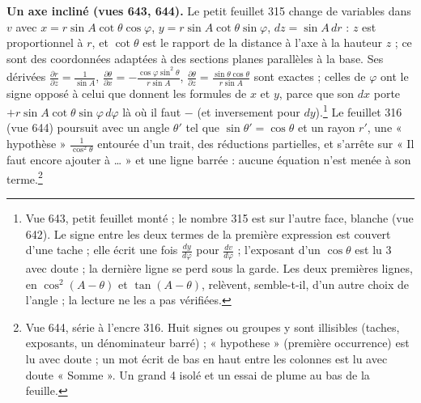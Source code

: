 \documentclass[11pt,a4paper]{article}
\begin{document}
\textbf{Un axe incliné (vues 643, 644).} Le petit feuillet 315 change de
variables dans $v$ avec $x = r\sin A\cot\theta\cos\varphi$, $y = r\sin
A\cot\theta\sin\varphi$, $dz = \sin A\,dr$ : $z$ est proportionnel à $r$, et
$\cot\theta$ est le rapport de la distance à l'axe à la hauteur $z$ ; ce sont
des coordonnées adaptées à des sections planes parallèles à la base. Ses
dérivées $\frac{\partial r}{\partial z} = \frac{1}{\sin A}$,
$\frac{\partial\theta}{\partial x} = -\frac{\cos\varphi\sin^2\theta}{r\sin A}$,
$\frac{\partial\theta}{\partial z} = \frac{\sin\theta\cos\theta}{r\sin A}$ sont
exactes ; celles de $\varphi$ ont le signe opposé à celui que donnent les
formules de $x$ et $y$, parce que son $dx$ porte $+r\sin A\cot\theta\sin\varphi
\,d\varphi$ là où il faut $-$ (et inversement pour $dy$).\footnote{Vue 643, petit
feuillet monté ; le nombre 315 est sur l'autre face, blanche (vue 642). Le
signe entre les deux termes de la première expression est couvert d'une tache
; elle écrit une fois $\frac{dy}{d\varphi}$ pour $\frac{dv}{d\varphi}$ ;
l'exposant d'un $\cos\theta$ est lu 3 avec doute ; la dernière ligne se perd
sous la garde. Les deux premières lignes, en $\cos^2(A-\theta)$ et
$\tan(A-\theta)$, relèvent, semble-t-il, d'un autre choix de l'angle ; la
lecture ne les a pas vérifiées.} Le feuillet 316 (vue 644) poursuit avec un angle $\theta'$
tel que $\sin\theta' = \cos\theta$ et un rayon $r'$, une « hypothèse »
$\frac{1}{\cos^2\theta}$ entourée d'un trait, des réductions partielles, et
s'arrête sur « Il faut encore ajouter à … » et une ligne barrée : aucune
équation n'est menée à son terme.\footnote{Vue 644, série à l'encre 316. Huit
signes ou groupes y sont illisibles (taches, exposants, un dénominateur barré) ;
« hypothese » (première occurrence) est lu avec doute ; un mot écrit de bas en
haut entre les colonnes est lu avec doute « Somme ». Un grand 4 isolé et un
essai de plume au bas de la feuille.}
\end{document}
